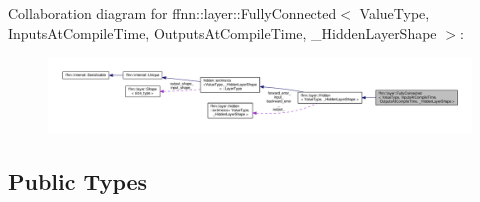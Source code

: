 Collaboration diagram for ffnn\-:\-:layer\-:\-:Fully\-Connected$<$ Value\-Type, Inputs\-At\-Compile\-Time, Outputs\-At\-Compile\-Time, \-\_\-\-Hidden\-Layer\-Shape $>$\-:\nopagebreak
\begin{figure}[H]
\begin{center}
\leavevmode
\includegraphics[width=350pt]{classffnn_1_1layer_1_1_fully_connected__coll__graph}
\end{center}
\end{figure}
\subsection*{Public Types}
